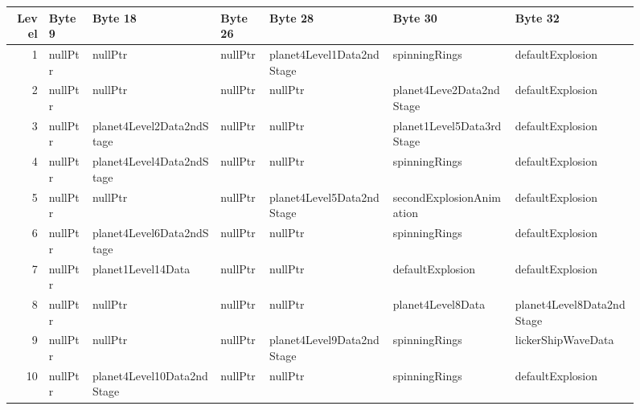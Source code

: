 \begin{figure}[H]
  {
    \setlength{\tabcolsep}{3.0pt}
    \setlength\cmidrulewidth{\heavyrulewidth} %
    \begin{adjustbox}{width=\textwidth}

      \begin{tabular}{rllllll}
        \toprule
        Level & Byte 9                   & Byte 18                    & Byte 26         & Byte 28                   & Byte 30                    & Byte 32                    \\
        \midrule
        1 & nullPtr                  & nullPtr                    & nullPtr         & planet4Level1Data2ndStage & spinningRings              & defaultExplosion           \\
        2 & nullPtr                  & nullPtr                    & nullPtr         & nullPtr                   & planet4Leve2Data2ndStage   & defaultExplosion           \\
        3 & nullPtr                  & planet4Level2Data2ndStage  & nullPtr         & nullPtr                   & planet1Level5Data3rdStage  & defaultExplosion           \\
        4 & nullPtr                  & planet4Level4Data2ndStage  & nullPtr         & nullPtr                   & spinningRings              & defaultExplosion           \\
        5 & nullPtr                  & nullPtr                    & nullPtr         & planet4Level5Data2ndStage & secondExplosionAnimation   & defaultExplosion           \\
        6 & nullPtr                  & planet4Level6Data2ndStage  & nullPtr         & nullPtr                   & spinningRings              & defaultExplosion           \\
        7 & nullPtr                  & planet1Level14Data         & nullPtr         & nullPtr                   & defaultExplosion           & defaultExplosion           \\
        8 & nullPtr                  & nullPtr                    & nullPtr         & nullPtr                   & planet4Level8Data          & planet4Level8Data2ndStage  \\
        9 & nullPtr                  & nullPtr                    & nullPtr         & planet4Level9Data2ndStage & spinningRings              & lickerShipWaveData         \\
        10 & nullPtr                  & planet4Level10Data2ndStage & nullPtr         & nullPtr                   & spinningRings              & defaultExplosion           \\

\end{tabular}
\end{adjustbox}}
\end{figure}
